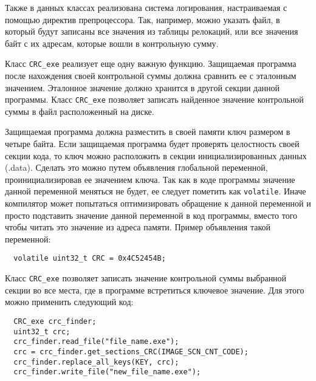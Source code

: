 Также в данных классах реализована система логирования, настраиваемая с помощью
директив препроцессора. Так, например, можно указать файл, в который будут
записаны все значения из таблицы релокаций, или все значения байт с их адресам,
которые вошли в контрольную сумму.

Класс \verb!CRC_exe! реализует еще одну важную функцию. Защищаемая программа
после нахождения своей контрольной суммы должна сравнить ее с эталонным
значением. Эталонное значение должно хранится в другой секции данной программы.
Класс \verb!CRC_exe! позволяет записать найденное значение контрольной суммы в
файл расположенный на диске. 

Защищаемая программа должна разместить в своей памяти ключ размером в четыре
байта. Если защищаемая программа будет проверять целостность своей секции кода,
то ключ можно расположить в секции инициализированных данных (.data). Сделать
это можно путем объявления глобальной переменной, проинициализировав ее
значением ключа. Так как в коде программы значение данной переменной меняться не
будет, ее следует пометить как \verb!volatile!. Иначе компилятор может
попытаться оптимизировать обращение к данной переменной и просто подставить
значение данной переменной в код программы, вместо того чтобы читать это
значение из адреса памяти. Пример объявления такой переменной:
\begin{verbatim}
  volatile uint32_t CRC = 0x4C52454B;
\end{verbatim}

Класс \verb!CRC_exe! позволяет записать значение контрольной суммы выбранной
секции во все места, где в программе встретиться ключевое значение. Для этого
можно применить следующий код:
\begin{verbatim}
  CRC_exe crc_finder;
  uint32_t crc;
  crc_finder.read_file("file_name.exe");
  crc = crc_finder.get_sections_CRC(IMAGE_SCN_CNT_CODE);
  crc_finder.replace_all_keys(KEY, crc);
  crc_finder.write_file("new_file_name.exe");
\end{verbatim}

